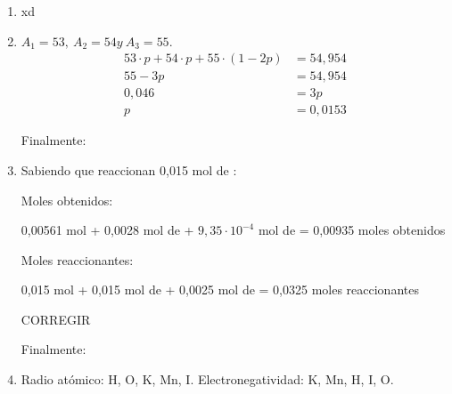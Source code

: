 \begin{enumerate}
\item xd


\item $A_1=53,\ A_2=54 y\ A_3=55.$
\begin{align*}
    53 \cdot p + 54 \cdot p + 55 \cdot (1 - 2p) &= 54,954\\    
    55 - 3p &= 54,954\\
    0,046 &= 3p\\
    p &= 0,0153
\end{align*}


\newpage
Finalmente:

\hfil {}\hfil


\item Sabiendo que reaccionan 0,015 mol de :

Moles obtenidos:

\hfil
0,00561 mol  + 0,0028 mol de  + $9,35\cdot10^{-4}$ mol de  = 0,00935 moles obtenidos
\hfil

Moles reaccionantes:

\hfil
0,015 mol  + 0,015 mol de  + 0,0025 mol de  = 0,0325 moles reaccionantes
\hfil

CORREGIR

Finalmente:

\hfil {}\hfil


\item Radio atómico: H, O, K, Mn, I.
\hfil
Electronegatividad: K, Mn, H, I, O.
\hfil

\end{enumerate}

